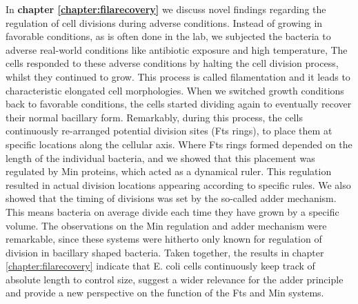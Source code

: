 In \textbf{chapter \ref{chapter:filarecovery}} we discuss 
novel findings regarding 
the regulation of cell divisions during adverse conditions.
%
Instead of growing \ecoli in favorable conditions, as is often done in the lab, we subjected the bacteria to 
adverse real-world conditions like antibiotic exposure and high temperature, 
%
The cells responded to these adverse conditions by halting the cell division process, whilst they continued to grow.
This process is called filamentation and it leads to characteristic elongated cell morphologies.
%
%
When we switched growth conditions back to favorable conditions,
the cells started dividing again to eventually recover their normal bacillary form. %
%
Remarkably, during this process,
the cells continuously re-arranged potential division sites (Fts rings), 
to place them at specific locations along the cellular axis. %
%
Where Fts rings formed depended on the length of the individual bacteria,
and we showed that this placement was regulated by Min proteins, which acted as a dynamical ruler.
%
This regulation resulted in actual division locations appearing according to specific rules.
%
We also showed that the timing of divisions was set by the so-called adder mechanism.
This means bacteria on average divide each time they have grown by a specific volume.
%
The observations on the Min regulation and adder mechanism were remarkable,
since these systems were hitherto only known for regulation of division in bacillary shaped bacteria.
%
Taken together, the results in chapter \ref{chapter:filarecovery} indicate that E. coli cells continuously keep track of absolute length to control size, 
suggest a wider relevance for the adder principle 
and provide a new perspective on the function of the Fts and Min systems.



